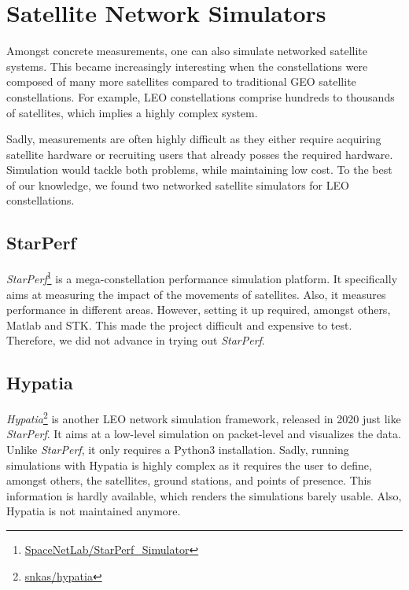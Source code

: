 \section{Satellite Network Simulators} \label{sec:satellite_network_simulators}

Amongst concrete measurements, one can also simulate networked satellite
systems. This became increasingly interesting when the constellations were
composed of many more satellites compared to traditional \ac{GEO} satellite
constellations. For example, \ac{LEO} constellations comprise hundreds to
thousands of satellites, which implies a highly complex system.

Sadly, measurements are often highly difficult as they either require acquiring
satellite hardware or recruiting users that already posses the required
hardware. Simulation would tackle both problems, while maintaining low cost. To
the best of our knowledge, we found two networked satellite simulators for
\ac{LEO} constellations.

\subsection{StarPerf} \label{sec:starperf}

\textit{StarPerf}\footnote{\href{https://github.com/SpaceNetLab/StarPerf\_Simulator}{SpaceNetLab/StarPerf\_Simulator}}
\cite{DBLP:conf/icnp/LaiLL20} is a mega-constellation performance simulation
platform. It specifically aims at measuring the impact of the movements of
satellites. Also, it measures performance in different areas. However, setting
it up required, amongst others, Matlab and \ac{STK}. This made the project
difficult and expensive to test. Therefore, we did not advance in trying out
\textit{StarPerf}.

\subsection{Hypatia} \label{sec:hypatia}

\textit{Hypatia}\footnote{\href{https://github.com/snkas/hypatia}{snkas/hypatia}}
\cite{DBLP:conf/imc/KassingBASS20} is another \ac{LEO} network simulation
framework, released in 2020 just like \textit{StarPerf}. It aims at a low-level
simulation on packet-level and visualizes the data. Unlike \textit{StarPerf},
it only requires a Python3 installation. Sadly, running simulations with
Hypatia is highly complex as it requires the user to define, amongst others,
the satellites, ground stations, and points of presence. This information is
hardly available, which renders the simulations barely usable. Also, Hypatia is
not maintained anymore.

